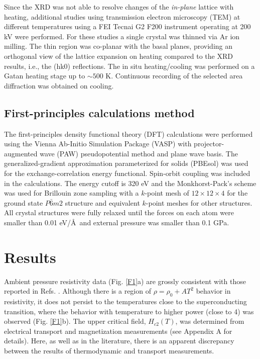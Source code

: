 \documentclass[aps,prb,preprint,groupedaddress,showpacs,amsmath,amssymb]{revtex4}
\begin{document}
Since the XRD was not able to resolve changes of the {\it in-plane} lattice with heating, additional studies using transmission electron microscopy (TEM) at different temperatures  using a FEI Tecnai G2 F200 instrument operating at 200 kV were performed. For these studies a single crystal was thinned via Ar ion milling. The thin region was co-planar with the basal planes, providing an orthogonal view of the lattice expansion on heating compared to the XRD results, i.e., the (hk0) reflections. The in situ heating/cooling was performed on a Gatan heating stage up to $\sim 500$ K. Continuous recording of the selected area diffraction was obtained on cooling. 

\subsection{First-principles calculations method}

The first-principles density functional theory (DFT) \cite{koh65a} calculations were performed using the Vienna Ab-Initio Simulation Package (VASP) \cite{kre96a} with projector-augmented wave (PAW) pseudopotential method  \cite{blo94a,kre99a} and plane wave basis. The generalized-gradient approximation parameterized for solids (PBEsol) \cite{per08a} was used for the exchange-correlation energy functional. Spin-orbit coupling was included in the calculations. The energy cutoff is 320 eV and the Monkhorst-Pack's scheme \cite{mon76a} was  used for Brillouin zone sampling with a $k$-point mesh of $12 \times 12 \times 4$ for the ground state $P\bar{6}m2$ structure and equivalent $k$-point meshes for other structures. All crystal structures were fully relaxed until the forces on each atom were smaller than 0.01 eV/\AA~and external pressure was smaller than 0.1 GPa.


\section{Results}
Ambient pressure resistivity data  (Fig. \ref{F1}a) are grossly consistent with those reported in Refs. . Although there is a region of $\rho = \rho_0 +AT^2$ behavior in resistivity, it does not persist to the temperatures close to the superconducting transition, where the behavior with temperature to higher power  (close to 4) was observed (Fig. \ref{F1}b). The upper critical field, $H_{c2}(T)$, was determined from electrical transport and magnetization measurements (see Appendix A for details). Here, as well as in the literature,  \cite{zha16a} there is an apparent discrepancy between the results of thermodynamic and transport measurements. 
\end{document}
